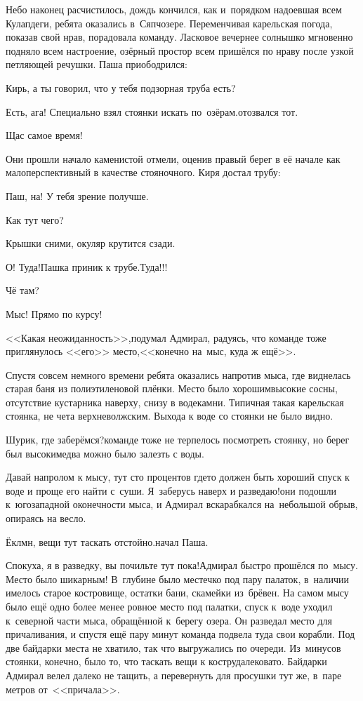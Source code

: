 Небо наконец расчистилось, дождь кончился, как и~порядком надоевшая всем Кулапдеги, ребята оказались в~Сяпчозере. Переменчивая карельская погода, показав свой нрав, порадовала команду. Ласковое вечернее солнышко мгновенно подняло всем настроение, озёрный простор всем пришёлся по нраву после узкой петляющей речушки. Паша приободрился:

\diagdash Кирь, а ты говорил, что у тебя подзорная труба есть?

\diagdash Есть, ага! Специально взял стоянки искать по~озёрам.\mdash отозвался тот.  

\diagdash Щас самое время!

Они прошли начало каменистой отмели, оценив правый берег в её начале как малоперспективный в качестве стояночного. Киря достал трубу:

\diagdash Паш, на! У тебя зрение получше.

\diagdash Как тут чего?

\diagdash Крышки сними, окуляр крутится сзади.

\diagdash О! Туда!\mdash Пашка приник к трубе.\mdash Туда!!!

\diagdash Чё там?

\diagdash Мыс! Прямо по курсу!

<<Какая неожиданность>>,\mdash подумал Адмирал, радуясь, что команде тоже приглянулось <<его>> место,\mdash <<конечно на~мыс, куда ж ещё>>.

Спустя совсем немного времени ребята оказались напротив мыса, где виднелась старая баня из полиэтиленовой плёнки. Место было хорошим\mdash высокие сосны, отсутствие кустарника наверху, снизу в воде\mdash камни. Типичная такая карельская стоянка, не чета верхневолжским. Выхода к воде со стоянки не было видно. 

\diagdash Шурик, где заберёмся?\mdash команде тоже не терпелось посмотреть стоянку, но берег был высоким\mdash едва можно было залезть с воды.

\diagdash Давай напролом к мысу, тут сто процентов где\sdash то должен быть хороший спуск к воде и проще его найти с~суши. Я~заберусь наверх и разведаю!\mdash они подошли к~юго\sdash западной оконечности мыса, и Адмирал вскарабкался на~небольшой обрыв, опираясь на весло.

\diagdash Ёклмн, вещи тут таскать отстойно.\mdash начал Паша. 

\diagdash Спокуха, я в разведку, вы почильте тут пока!\mdash Адмирал быстро прошёлся по~мысу. Место было шикарным! В~глубине было местечко под пару палаток, в~наличии имелось старое костровище, остатки бани, скамейки из~брёвен. На самом мысу было ещё одно более менее ровное место под палатки, спуск к~воде уходил к~северной части мыса, обращённой к~берегу озера. Он разведал место для причаливания, и спустя ещё пару минут команда подвела туда свои корабли. Под две байдарки места не хватило, так что выгружались по очереди. Из~минусов стоянки, конечно, было то, что таскать вещи к костру\mdash далековато. Байдарки Адмирал велел далеко не тащить, а перевернуть для просушки тут же, в~паре метров от~<<причала>>.

